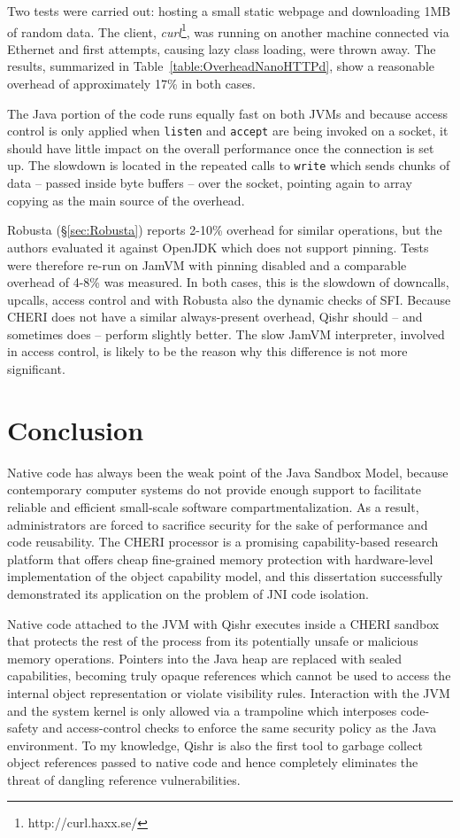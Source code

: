 \documentclass[a4paper,12pt,twoside,openright]{report}
\begin{document}
Two tests were carried out: hosting a small static webpage and downloading 1MB of random data. The client, \emph{curl}\footnote{http://curl.haxx.se/}, was running on another machine connected via Ethernet and first attempts, causing lazy class loading, were thrown away. The results, summarized in Table~\ref{table:OverheadNanoHTTPd}, show a reasonable overhead of approximately 17\% in both cases.

The Java portion of the code runs equally fast on both JVMs and because access control is only applied when \texttt{listen} and \texttt{accept} are being invoked on a socket, it should have little impact on the overall performance once the connection is set up. The slowdown is located in the repeated calls to \texttt{write} which sends chunks of data -- passed inside byte buffers -- over the socket, pointing again to array copying as the main source of the overhead.

Robusta (\S\ref{sec:Robusta}) reports 2-10\% overhead for similar operations, but the authors evaluated it against OpenJDK which does not support pinning. Tests were therefore re-run on JamVM with pinning disabled and a comparable overhead of 4-8\% was measured. In both cases, this is the slowdown of downcalls, upcalls, access control and with Robusta also the dynamic checks of SFI. Because CHERI does not have a similar always-present overhead, Qishr should -- and sometimes does -- perform slightly better. The slow JamVM interpreter, involved in access control, is likely to be the reason why this difference is not more significant.

\chapter{Conclusion} 

Native code has always been the weak point of the Java Sandbox Model, because contemporary computer systems do not provide enough support to facilitate reliable and efficient small-scale software compartmentalization. As a result, administrators are forced to sacrifice security for the sake of performance and code reusability. The CHERI processor is a promising capability-based research platform that offers cheap fine-grained memory protection with hardware-level implementation of the object capability model, and this dissertation successfully demonstrated its application on the problem of JNI code isolation.

Native code attached to the JVM with Qishr executes inside a CHERI sandbox that protects the rest of the process from its potentially unsafe or malicious memory operations. Pointers into the Java heap are replaced with sealed capabilities, becoming truly opaque references which cannot be used to access the internal object representation or violate visibility rules. Interaction with the JVM and the system kernel is only allowed via a trampoline which interposes code-safety and access-control checks to enforce the same security policy as the Java environment. To my knowledge, Qishr is also the first tool to garbage collect object references passed to native code and hence completely eliminates the threat of dangling reference vulnerabilities.
\end{document}
